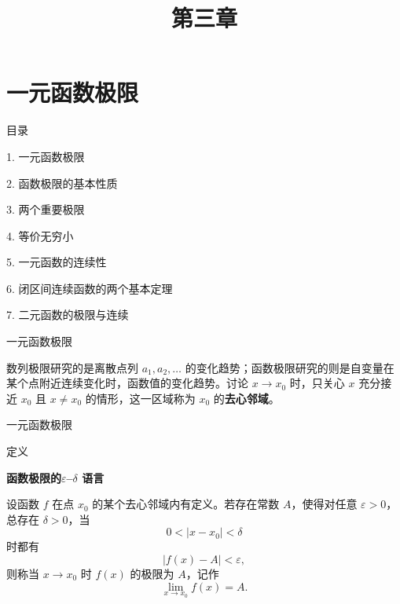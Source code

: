 \documentclass[aspectratio=169,10pt,fontset=fandol]{ctexbeamer}
\title{第三章}
\begin{document}
\section{一元函数极限}
\begin{frame}[t,fragile]{目录}
\normalsize
{\color{blue}\normalsize 1. 一元函数极限\par}\vspace{0.22em}
{\color{gray!40}\normalsize 2. 函数极限的基本性质\par}\vspace{0.22em}
{\color{gray!40}\normalsize 3. 两个重要极限\par}\vspace{0.22em}
{\color{gray!40}\normalsize 4. 等价无穷小\par}\vspace{0.22em}
{\color{gray!40}\normalsize 5. 一元函数的连续性\par}\vspace{0.22em}
{\color{gray!40}\normalsize 6. 闭区间连续函数的两个基本定理\par}\vspace{0.22em}
{\color{gray!40}\normalsize 7. 二元函数的极限与连续\par}\vspace{0.22em}
\end{frame}
\begin{frame}[t,fragile]{一元函数极限}
\normalsize
{\normalsize
数列极限研究的是离散点列 \(a_1,a_2,\ldots\) 的变化趋势；函数极限研究的则是自变量在某个点附近连续变化时，函数值的变化趋势。讨论 \(x\to x_0\) 时，只关心 \(x\) 充分接近 \(x_0\) 且 \(x\neq x_0\) 的情形，这一区域称为 \(x_0\) 的\textbf{去心邻域}。


}
\end{frame}
\begin{frame}[t,fragile]{一元函数极限}
\normalsize
\begin{block}{定义}
{\normalsize
\textbf{函数极限的\(\varepsilon\)--\(\delta\) 语言}\par

设函数 \(f\) 在点 \(x_0\) 的某个去心邻域内有定义。若存在常数 \(A\)，使得对任意 \(\varepsilon>0\)，总存在 \(\delta>0\)，当
\[
0<|x-x_0|<\delta
\]
时都有
\[
|f(x)-A|<\varepsilon,
\]
则称当 \(x\to x_0\) 时 \(f(x)\) 的极限为 \(A\)，记作
\[
\lim_{x\to x_0}f(x)=A.
\]

}
\end{block}
\end{frame}
\end{document}
